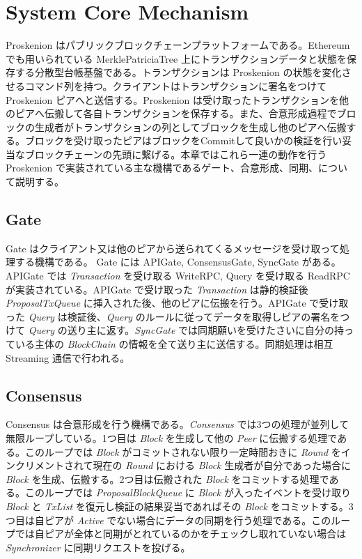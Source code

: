 \hypertarget{system-core-mechanism}{%
\section{System Core Mechanism}\label{system-core-mechanism}}

Proskenion はパブリックブロックチェーンプラットフォームである。Ethereum
でも用いられている MerklePatriciaTree
上にトランザクションデータと状態を保存する分散型台帳基盤である。トランザクションは
Proskenion
の状態を変化させるコマンド列を持つ。クライアントはトランザクションに署名をつけて
Proskenion ピアへと送信する。Proskenion
は受け取ったトランザクションを他のピアへ伝搬して各自トランザクションを保存する。また、合意形成過程でブロックの生成者がトランザクションの列としてブロックを生成し他のピアへ伝搬する。ブロックを受け取ったピアはブロックをCommitして良いかの検証を行い妥当なブロックチェーンの先頭に繋げる。本章ではこれら一連の動作を行う
Proskenion
で実装されている主な機構であるゲート、合意形成、同期、について説明する。

\hypertarget{gate}{%
\subsection{Gate}\label{gate}}

Gate
はクライアント又は他のピアから送られてくるメッセージを受け取って処理する機構である。
Gate には APIGate, ConsensusGate, SyncGate がある。APIGate では
\emph{Transaction} を受け取る WriteRPC, Query を受け取る ReadRPC
が実装されている。APIGate で受け取った \emph{Transaction} は静的検証後
\emph{ProposalTxQueue} に挿入された後、他のピアに伝搬を行う。APIGate
で受け取った \emph{Query} は検証後、\emph{Query}
のルールに従ってデータを取得しピアの署名をつけて \emph{Query}
の送り主に返す。\emph{SyncGate}
では同期願いを受けたさいに自分の持っている主体の \emph{BlockChain}
の情報を全て送り主に送信する。同期処理は相互 Streaming 通信で行われる。

\hypertarget{consensus}{%
\subsection{Consensus}\label{consensus}}

Consensus は合意形成を行う機構である。\emph{Consensus}
では3つの処理が並列して無限ループしている。1つ目は \emph{Block}
を生成して他の \emph{Peer} に伝搬する処理である。このループでは
\emph{Block} がコミットされない限り一定時間おきに \emph{Round}
をインクリメントされて現在の \emph{Round} における \emph{Block}
生成者が自分であった場合に \emph{Block}
を生成、伝搬する。2つ目は伝搬された \emph{Block}
をコミットする処理である。このループでは \emph{ProposalBlockQueue} に
\emph{Block} が入ったイベントを受け取り \emph{Block} と \emph{TxList}
を復元し検証の結果妥当であればその \emph{Block}
をコミットする。3つ目は自ピアが \emph{Active}
でない場合にデータの同期を行う処理である。このループでは自ピアが全体と同期がとれているのかをチェックし取れていない場合は
\emph{Synchronizer} に同期リクエストを投げる。

